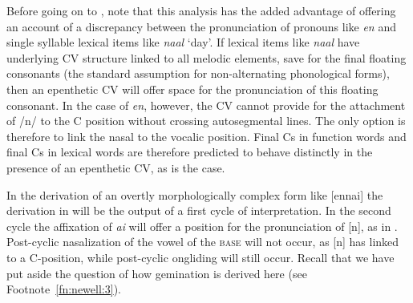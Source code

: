 \documentclass[output=paper]{langscibook}
\begin{document}
Before going on to , note that this analysis has the added advantage of offering an account of a discrepancy between the pronunciation of pronouns like \textit{en} and single syllable lexical items like \textit{naal} ‘day’. If lexical items like \textit{naal} have underlying CV structure linked to all melodic elements, save for the final floating consonants (the standard assumption for non-alternating phonological forms), then an epenthetic CV will offer space for the pronunciation of this floating consonant. In the case of \textit{en}, however, the CV cannot provide for the attachment of /n/ to the C position without crossing autosegmental lines. The only option is therefore to link the nasal to the vocalic position. Final Cs in function words and final Cs in lexical words are therefore predicted to behave distinctly in the presence of an epenthetic CV, as is the case.

In the derivation of an overtly morphologically complex form like [ennai] the derivation in  will be the output of a first cycle of interpretation. In the second cycle the affixation of \textit{ai} will offer a position for the pronunciation of [n], as in . Post-cyclic nasalization of the vowel of the \textsc{base} will not occur, as [n] has linked to a C-position, while post-cyclic ongliding will still occur. Recall that we have put aside the question of how gemination is derived here (see Footnote~\ref{fn:newell:3}).
\end{document}
